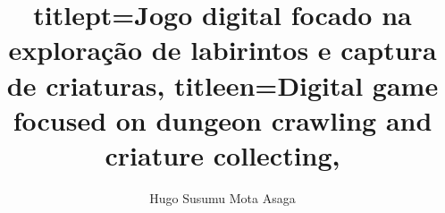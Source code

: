 
\title{
    titlept={Jogo digital focado na exploração de labirintos e captura de criaturas},
    titleen={Digital game focused on dungeon crawling and criature collecting},
}

\author{Hugo Susumu Mota Asaga}




